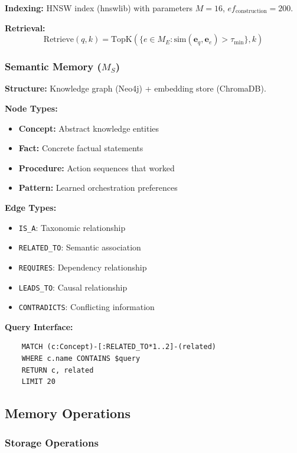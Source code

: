 \documentclass{article}
\theoremstyle{plain}
\theoremstyle{definition}
\theoremstyle{remark}
\begin{document}
\textbf{Indexing:} HNSW index (hnswlib) with parameters $M=16$, $ef_{\text{construction}}=200$.

\textbf{Retrieval:}
\begin{equation}
	\text{Retrieve}(q, k) = \text{TopK}(\{e \in M_E : \text{sim}(\mathbf{e}_q, \mathbf{e}_e) > \tau_{\text{min}}\}, k)
\end{equation}

\subsubsection{Semantic Memory ($M_S$)}

\textbf{Structure:} Knowledge graph (Neo4j) + embedding store (ChromaDB).

\textbf{Node Types:}
\begin{itemize}
	\item \textbf{Concept:} Abstract knowledge entities
	\item \textbf{Fact:} Concrete factual statements
	\item \textbf{Procedure:} Action sequences that worked
	\item \textbf{Pattern:} Learned orchestration preferences
\end{itemize}

\textbf{Edge Types:}
\begin{itemize}
	\item \texttt{IS\_A}: Taxonomic relationship
	\item \texttt{RELATED\_TO}: Semantic association
	\item \texttt{REQUIRES}: Dependency relationship
	\item \texttt{LEADS\_TO}: Causal relationship
	\item \texttt{CONTRADICTS}: Conflicting information
\end{itemize}

\textbf{Query Interface:}
\begin{verbatim}
	MATCH (c:Concept)-[:RELATED_TO*1..2]-(related)
	WHERE c.name CONTAINS $query
	RETURN c, related
	LIMIT 20
\end{verbatim}

\subsection{Memory Operations}
\label{sec:uma_operations}

\subsubsection{Storage Operations}
\end{document}
